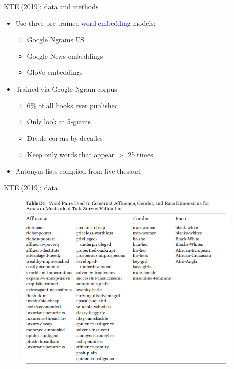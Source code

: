\documentclass[usenames,dvipsnames,english]{beamer}
\begin{document}
\begin{frame}{KTE (2019): data and methods}
    \begin{itemize}
    \setlength{\itemsep}{1.2em}
        \item Use three pre-trained \textcolor{blue}{word embedding} models:
        \begin{itemize}
        \setlength{\itemsep}{0.8em}
\vspace{5pt}
            \item Google Ngrams US
            \item Google News embeddings
            \item GloVe embeddings
        \end{itemize}
        \item Trained via Google Ngram corpus
            \begin{itemize}
            \setlength{\itemsep}{0.8em}
    \vspace{5pt}
                \item 6\% of all books ever published
                \item Only look at 5-grams
                \item Divide corpus by decades
                \item Keep only words that appear $>$ 25 times
        \end{itemize}
	\item Antonym lists compiled from five thesauri
    \end{itemize}
\end{frame}
\begin{frame}{KTE (2019): data}
\begin{figure}
    \centering
    \includegraphics[scale = 0.5]{Images/kte_methods1.png}
    \end{figure}
\end{frame}
\end{document}
